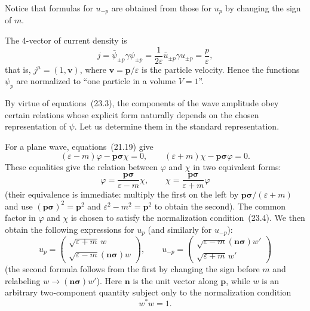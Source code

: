 Notice that formulas for $u_{-p}$ are obtained from those for $u_p$ by changing the sign of $m$.

The 4-vector of current density is
\begin{equation}
j = \bar\psi_{\pm p}\gamma\psi_{\pm p} = \frac{1}{2\varepsilon}\bar u_{\pm p}\gamma u_{\pm p} = \frac{p}{\varepsilon},
\tag{23.6}
\end{equation}
that is, $j^\mu = (1, \mathbf{v})$, where $\mathbf{v} = \mathbf{p}/\varepsilon$ is the particle velocity. Hence the functions $\psi_p$ are normalized to ``one particle in a volume $V = 1$''.

By virtue of equations~(23.3), the components of the wave amplitude obey certain relations whose explicit form naturally depends on the chosen representation of $\psi$. Let us determine them in the standard representation.

For a plane wave, equations~(21.19) give
\begin{equation}
(\varepsilon - m)\varphi - \mathbf{p}\boldsymbol{\sigma}\chi = 0,\qquad (\varepsilon + m)\chi - \mathbf{p}\boldsymbol{\sigma}\varphi = 0.
\tag{23.7}
\end{equation}
These equalities give the relation between $\varphi$ and $\chi$ in two equivalent forms:
\begin{equation}
\varphi = \frac{\mathbf{p}\boldsymbol{\sigma}}{\varepsilon - m}\chi,\qquad \chi = \frac{\mathbf{p}\boldsymbol{\sigma}}{\varepsilon + m}\varphi
\tag{23.8}
\end{equation}
(their equivalence is immediate: multiply the first on the left by $\mathbf{p}\boldsymbol{\sigma}/(\varepsilon + m)$ and use $(\mathbf{p}\boldsymbol{\sigma})^2 = \mathbf{p}^2$ and $\varepsilon^2 - m^2 = \mathbf{p}^2$ to obtain the second). The common factor in $\varphi$ and $\chi$ is chosen to satisfy the normalization condition~(23.4). We then obtain the following expressions for $u_p$ (and similarly for $u_{-p}$):
\begin{equation}
u_p = \begin{pmatrix} \sqrt{\varepsilon + m}\,w\\ \sqrt{\varepsilon - m}(\mathbf{n}\boldsymbol{\sigma})w \end{pmatrix},\qquad u_{-p} = \begin{pmatrix} \sqrt{\varepsilon - m}(\mathbf{n}\boldsymbol{\sigma})w'\\ \sqrt{\varepsilon + m}\,w' \end{pmatrix}
\tag{23.9}
\end{equation}
(the second formula follows from the first by changing the sign before $m$ and relabeling $w \to (\mathbf{n}\boldsymbol{\sigma})w'$). Here $\mathbf{n}$ is the unit vector along $\mathbf{p}$, while $w$ is an arbitrary two-component quantity subject only to the normalization condition
\begin{equation}
w^*w = 1.
\tag{23.10}
\end{equation}

